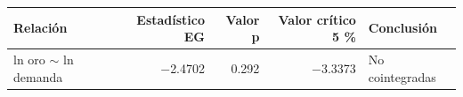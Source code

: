 \begin{tabularx}{\linewidth}{>{\raggedright\arraybackslash}Xrrrl}
\toprule
Relación & Estadístico EG & Valor p & Valor crítico 5 \% & Conclusión \\
\midrule
ln oro $\sim$ ln demanda & $-$2.4702 & 0.292 & $-$3.3373 & No cointegradas \\
\bottomrule
\end{tabularx}
